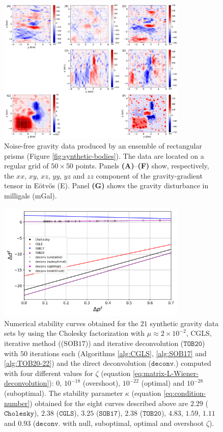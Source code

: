 \begin{figure}[htbp]
	\begin{center}
			\includegraphics[width=9cm]{Fig/noise-free-data}
		\end{center}
	\caption{
		Noise-free gravity data produced by an ensemble of rectangular prisms (Figure \ref{fig:synthetic-bodies}). 
		The data are located on a regular grid of $50 \times 50$ points. 
		Panels \textbf{(A)}--\textbf{(F)} show, respectively, the $xx$, $xy$, $xz$, $yy$, $yz$ and
		$zz$ component of the gravity-gradient tensor in Eötvös (E).
		Panel \textbf{(G)} shows the gravity disturbance in milligals (mGal).
		}
	\label{fig:noise-free-data}
\end{figure}

\begin{figure}[htbp]
	\begin{center}
		\includegraphics[width=9cm]{Fig/stability-comparison}
	\end{center}
	\caption{
		Numerical stability curves obtained for the $21$ synthetic gravity data sets 
		by using the Cholesky factorization with $\mu \approx 2 \times 10^{-2}$, 
		CGLS, iterative method (($\mathrm{SOB17}$)) and iterative deconvolution
		($\mathtt{TOB20}$) with $50$ iterations each (Algorithms \ref{alg:CGLS}, \ref{alg:SOB17} and \ref{alg:TOB20-22}) 
		and the direct deconvolution ($\mathtt{deconv.}$) computed with four different values for $\zeta$ 
		(equation \ref{eq:matrix-L-Wiener-deconvolution}): $0$, $10^{-18}$ (overshoot), $10^{-22}$ (optimal)
		and $10^{-28}$ (suboptimal).
		The stability parameter $\kappa$ (equation \ref{eq:condition-number}) obtained for the eight curves described above are $2.29$ ($\mathtt{Cholesky}$), $2.38$ 
		($\mathtt{CGLS}$), $3.25$ ($\mathtt{SOB17}$), $2.38$ ($\mathtt{TOB20}$), $4.83$, $1.59$, $1.11$ and $0.93$ ($\mathtt{deconv.}$ with null, suboptimal, optimal and overshoot $\zeta$).
		}
	\label{fig:stability-comparison}
\end{figure}

